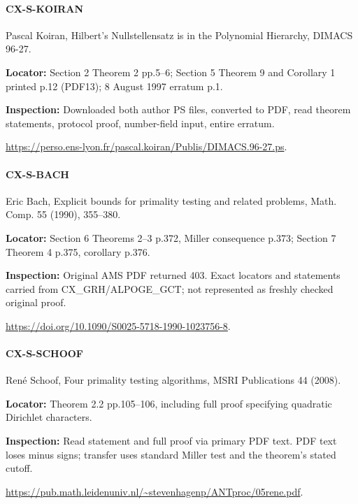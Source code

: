 \documentclass[11pt,a4paper]{article}
\begin{document}
\paragraph{CX-S-KOIRAN} Pascal Koiran, Hilbert’s Nullstellensatz is in the Polynomial Hierarchy, DIMACS 96-27.

\textbf{Locator:} Section 2 Theorem 2 pp.\allowbreak{}5–\allowbreak{}6; Section 5 Theorem 9 and Corollary 1 printed p.\allowbreak{}12 (PDF13); 8 August 1997 erratum p.\allowbreak{}1.

\textbf{Inspection:} Downloaded both author PS files, converted to PDF, read theorem statements, protocol proof, number-field input, entire erratum.\allowbreak{}

\url{https://perso.ens-lyon.fr/pascal.koiran/Publis/DIMACS.96-27.ps}.

\paragraph{CX-S-BACH} Eric Bach, Explicit bounds for primality testing and related problems, Math.\allowbreak{} Comp.\allowbreak{} 55 (1990), 355–\allowbreak{}380.

\textbf{Locator:} Section 6 Theorems 2–\allowbreak{}3 p.\allowbreak{}372, Miller consequence p.\allowbreak{}373; Section 7 Theorem 4 p.\allowbreak{}375, corollary p.\allowbreak{}376.

\textbf{Inspection:} Original AMS PDF returned 403.\allowbreak{} Exact locators and statements carried from CX\_\allowbreak{}GRH/\allowbreak{}ALPOGE\_\allowbreak{}GCT; not represented as freshly checked original proof.\allowbreak{}

\url{https://doi.org/10.1090/S0025-5718-1990-1023756-8}.

\paragraph{CX-S-SCHOOF} René Schoof, Four primality testing algorithms, MSRI Publications 44 (2008).

\textbf{Locator:} Theorem 2.\allowbreak{}2 pp.\allowbreak{}105–\allowbreak{}106, including full proof specifying quadratic Dirichlet characters.

\textbf{Inspection:} Read statement and full proof via primary PDF text.\allowbreak{} PDF text loses minus signs; transfer uses standard Miller test and the theorem’s stated cutoff.\allowbreak{}

\url{https://pub.math.leidenuniv.nl/~stevenhagenp/ANTproc/05rene.pdf}.
\end{document}
